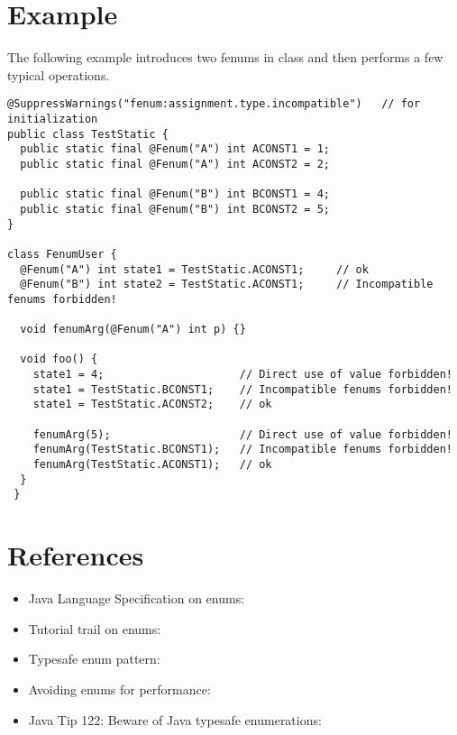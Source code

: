 \section{Example\label{fenum-example}}

The following example introduces two fenums in class 
and then performs a few typical operations.

\begin{Verbatim}
@SuppressWarnings("fenum:assignment.type.incompatible")   // for initialization
public class TestStatic {
  public static final @Fenum("A") int ACONST1 = 1;
  public static final @Fenum("A") int ACONST2 = 2;

  public static final @Fenum("B") int BCONST1 = 4;
  public static final @Fenum("B") int BCONST2 = 5;
}

class FenumUser {
  @Fenum("A") int state1 = TestStatic.ACONST1;     // ok
  @Fenum("B") int state2 = TestStatic.ACONST1;     // Incompatible fenums forbidden!

  void fenumArg(@Fenum("A") int p) {}
	
  void foo() {
    state1 = 4;                     // Direct use of value forbidden!
    state1 = TestStatic.BCONST1;    // Incompatible fenums forbidden!
    state1 = TestStatic.ACONST2;    // ok

    fenumArg(5);                    // Direct use of value forbidden!
    fenumArg(TestStatic.BCONST1);   // Incompatible fenums forbidden!
    fenumArg(TestStatic.ACONST1);   // ok
  }
 }
\end{Verbatim}


\section{References\label{fenum-references}}

\begin{itemize}
\item Java Language Specification on enums:\\

\item Tutorial trail on enums:\\

\item Typesafe enum pattern:\\

\item Avoiding enums for performance:\\

\item Java Tip 122: Beware of Java typesafe enumerations:\\

\end{itemize}

